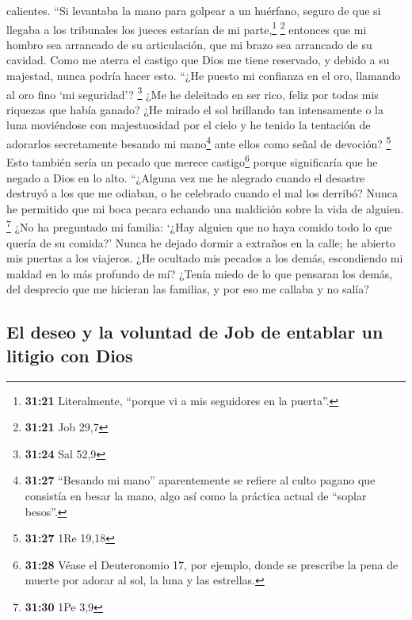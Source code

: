 calientes.  ``Si levantaba la mano para golpear a un
huérfano, seguro de que si llegaba a los tribunales los jueces estarían
de mi parte,\footnote{\textbf{31:21} Literalmente, ``porque vi a mis
  seguidores en la puerta''.} \footnote{\textbf{31:21} Job 29,7}
 entonces que mi hombro sea arrancado de su articulación,
que mi brazo sea arrancado de su cavidad.  Como me aterra
el castigo que Dios me tiene reservado, y debido a su majestad, nunca
podría hacer esto.  ``¿He puesto mi confianza en el oro,
llamando al oro fino `mi seguridad'? \footnote{\textbf{31:24} Sal 52,9}
 ¿Me he deleitado en ser rico, feliz por todas mis
riquezas que había ganado?  ¿He mirado el sol brillando
tan intensamente o la luna moviéndose con majestuosidad por el cielo
 y he tenido la tentación de adorarlos secretamente
besando mi mano\footnote{\textbf{31:27} ``Besando mi mano''
  aparentemente se refiere al culto pagano que consistía en besar la
  mano, algo así como la práctica actual de ``soplar besos''.} ante
ellos como señal de devoción? \footnote{\textbf{31:27} 1Re 19,18}
 Esto también sería un pecado que merece
castigo\footnote{\textbf{31:28} Véase el Deuteronomio 17, por ejemplo,
  donde se prescribe la pena de muerte por adorar al sol, la luna y las
  estrellas.} porque significaría que he negado a Dios en lo alto.
 ``¿Alguna vez me he alegrado cuando el desastre destruyó
a los que me odiaban, o he celebrado cuando el mal los derribó?
 Nunca he permitido que mi boca pecara echando una
maldición sobre la vida de alguien. \footnote{\textbf{31:30} 1Pe 3,9}
 ¿No ha preguntado mi familia: `¿Hay alguien que no haya
comido todo lo que quería de su comida?'  Nunca he dejado
dormir a extraños en la calle; he abierto mis puertas a los viajeros.
 ¿He ocultado mis pecados a los demás, escondiendo mi
maldad en lo más profundo de mí?  ¿Tenía miedo de lo que
pensaran los demás, del desprecio que me hicieran las familias, y por
eso me callaba y no salía?

\hypertarget{el-deseo-y-la-voluntad-de-job-de-entablar-un-litigio-con-dios}{%
\subsection{El deseo y la voluntad de Job de entablar un litigio con
Dios}\label{el-deseo-y-la-voluntad-de-job-de-entablar-un-litigio-con-dios}}


